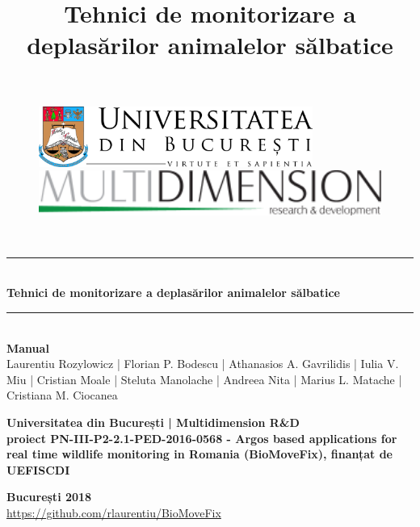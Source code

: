 \documentclass[11pt,onehalfspacing]{elife}
\title{
Tehnici de monitorizare a deplasărilor animalelor sălbatice}
\begin{document}
\begin{titlepage}

\newcommand{\HRule}{\rule{\linewidth}{0.2mm}}     
      
\begin{figure}[t]
\begin{minipage}{0.6\textwidth}\large
\begin{flushleft}
\includegraphics[width=0.8\textwidth]{UB.jpg}
\end{flushleft}
\end{minipage}
\begin{minipage}{0.4\textwidth}\large
\begin{flushright}
\includegraphics[width=1\textwidth]{logo-multidimension.png}

\end{flushright}
\end{minipage}
\end{figure}
\textsc{ \\[1cm]}


\begin{center}
\HRule
\\[0.5cm]
\textbf{\Large   Tehnici de monitorizare a deplasărilor animalelor sălbatice}
\HRule
\\[0.5cm]
\textbf{\large Manual}
\\[0.25cm]
\large      
{Laurentiu Rozylowicz | Florian P. Bodescu |  Athanasios A. Gavrilidis | Iulia V. Miu | Cristian Moale | Steluta Manolache | Andreea Nita | Marius L. Matache |\\ Cristiana M. Ciocanea}
   \end{center}
        
\vfill 
  \begin{center}
    \textbf{\large      
Universitatea din București | Multidimension R\&D\\[0.25cm]
proiect PN-III-P2-2.1-PED-2016-0568 - Argos based applications for real time wildlife monitoring in Romania (BioMoveFix), finanțat de UEFISCDI}\\
        \end{center}
\vfill 

\begin{center}
\textbf{București 2018}\\
\url{https://github.com/rlaurentiu/BioMoveFix}
 \end{center}
        
\end{titlepage}
\end{document}
